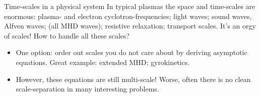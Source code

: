 \documentclass[aspectratio=169]{beamer}
\begin{document}
\begin{frame}{Time-scales in a physical system}
  In typical plasmas the space and time-scales are enormous: plasma-
  and electron cyclotron-frequencies; light waves; sound waves, Alfven
  waves; (all MHD waves); resistive relaxation; transport scales. It's
  an orgy of scales! How to handle all these scales?
  \begin{itemize}
  \item One option: order out scales you do not care about by deriving
    asymptotic equations. Great example: extended MHD; gyrokinetics.
  \item However, these equations are still multi-scale! Worse, often
    there is no clean scale-separation in many interesting problems.
  \end{itemize}
\end{frame}
\end{document}
